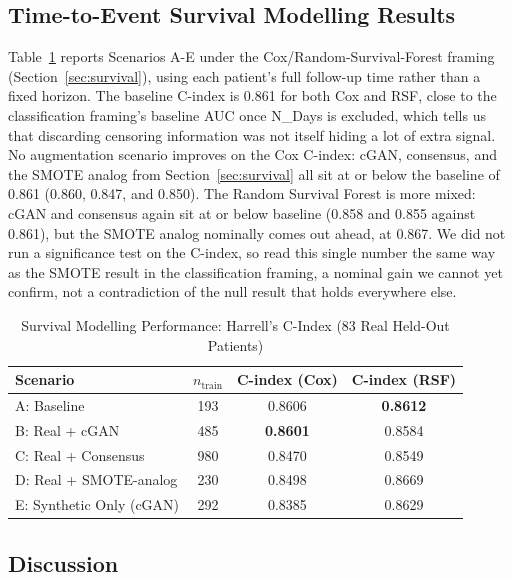 \documentclass[journal]{IEEEtran}
\begin{document}
\subsection{Time-to-Event Survival Modelling Results}
\label{sec:survivalresults}

Table~\ref{tab:survival} reports Scenarios A-E under the Cox/Random-Survival-Forest framing (Section~\ref{sec:survival}), using each patient's full follow-up time rather than a fixed horizon. The baseline C-index is 0.861 for both Cox and RSF, close to the classification framing's baseline AUC once N\_Days is excluded, which tells us that discarding censoring information was not itself hiding a lot of extra signal. No augmentation scenario improves on the Cox C-index: cGAN, consensus, and the SMOTE analog from Section~\ref{sec:survival} all sit at or below the baseline of 0.861 (0.860, 0.847, and 0.850). The Random Survival Forest is more mixed: cGAN and consensus again sit at or below baseline (0.858 and 0.855 against 0.861), but the SMOTE analog nominally comes out ahead, at 0.867. We did not run a significance test on the C-index, so read this single number the same way as the SMOTE result in the classification framing, a nominal gain we cannot yet confirm, not a contradiction of the null result that holds everywhere else.

\begin{table}[!tb]
  \centering
  \caption{Survival Modelling Performance: Harrell's C-Index (83 Real Held-Out Patients)}
  \label{tab:survival}
  \begin{tabular}{lccc}
    \toprule
    Scenario & $n_{\text{train}}$ & C-index (Cox) & C-index (RSF) \\
    \midrule
    A: Baseline          & 193 & 0.8606 & \textbf{0.8612} \\
    B: Real + cGAN      & 485 & \textbf{0.8601} & 0.8584 \\
    C: Real + Consensus  & 980 & 0.8470 & 0.8549 \\
    D: Real + SMOTE-analog & 230 & 0.8498 & 0.8669 \\
    E: Synthetic Only (cGAN) & 292 & 0.8385 & 0.8629 \\
    \bottomrule
  \end{tabular}
\end{table}

\subsection{Discussion}
\end{document}
